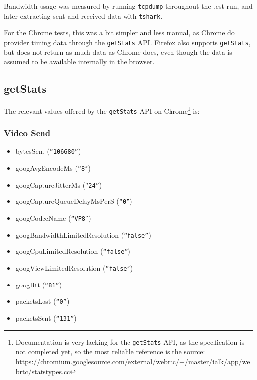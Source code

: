 Bandwidth usage was measured by running \texttt{tcpdump} throughout the test run, and later extracting sent and received data with \texttt{tshark}.

For the Chrome tests, this was a bit simpler and less manual, as Chrome do provider timing data through the \texttt{getStats} API. Firefox also supports \texttt{getStats}, but does not return as much data as Chrome does, even though the data is assumed to be available internally in the browser.

\subsection{getStats}

The relevant values offered by the \texttt{getStats}-API on Chrome\footnote{Documentation is very lacking for the \texttt{getStats}-API, as the specification is not completed yet, so the most reliable reference is the source: \url{https://chromium.googlesource.com/external/webrtc/+/master/talk/app/webrtc/statstypes.cc}} is:

\subsubsection{Video Send}
\begin{itemize}
    \setlength\itemsep{.5em}
    \item bytesSent (\texttt{``106680''})
    \item googAvgEncodeMs (\texttt{``8''})
    \item googCaptureJitterMs (\texttt{``24''})
    \item googCaptureQueueDelayMsPerS (\texttt{``0''})
    \item googCodecName (\texttt{``VP8''})
    \item googBandwidthLimitedResolution (\texttt{``false''})
    \item googCpuLimitedResolution (\texttt{``false''})
    \item googViewLimitedResolution (\texttt{``false''})
    \item googRtt (\texttt{``81''})
    \item packetsLost (\texttt{``0''})
    \item packetsSent (\texttt{``131''})
\end{itemize}

